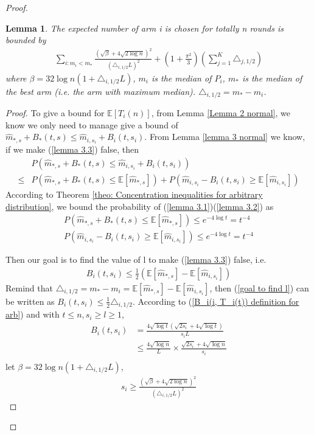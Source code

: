 \documentclass{article}
\theoremstyle{plain}
\newtheorem{lemma}{Lemma}
\begin{document}
\begin{proof}
\begin{lemma}
\label{Lemma 4: bound for E[T_i(n)]}
    The expected number of arm i is chosen for totally n rounds is bounded by
    \begin{align}
    \sum_{i: m_i < m_\ast} \frac{(\sqrt{\beta} + 4\sqrt{2\log n})^2}{ (\triangle_{i, 1/2} L)^2} + (1 + \frac{\pi^2}{3}) (\sum_{j=1}^K \triangle_{j, 1/2})
\end{align}
where $\beta = 32 \log n (1 + \triangle_{i, 1/2} L)$, $m_i$ is the median of $P_i$, $m_\ast$ is the median of the best arm (i.e. the arm with maximum median). $\triangle_{i, 1/2} = m_\ast - m_i$.
\end{lemma}

\begin{proof}
To give a bound for $\mathbb{E}[T_i(n)]$, from Lemma \ref{Lemma 2 normal}, we know we only need to manage give a bound of $\hat{m}_{*, s} + B_*(t, s)  \leq \hat{m}_{i, s_i} + B_i(t, s_i)$. From Lemma \ref{lemma 3 normal} we know, if we make (\ref{lemma 3.3}) false, then
\begin{align}
    & P(\hat{m}_{*, s} + B_*(t, s)  \leq \hat{m}_{i, s_i} + B_i(t, s_i)) \\
    \leq &  P(\hat{m}_{*, s} + B_*(t, s) \leq  \mathbb{E}[\hat{m}_{*, s}]) + P(\hat{m}_{i, s_i} - B_i(t, s_i) \geq \mathbb{E}[\hat{m}_{i, s_i}])
\end{align}
According to Theorem \ref{theo: Concentration inequalities for arbitrary distribution}, we bound the probability of (\ref{lemma 3.1})(\ref{lemma 3.2}) as
    \begin{align}
        P(\hat{m}_{*, s} + B_*(t, s) \leq  \mathbb{E}[\hat{m}_{*, s}]) \leq  e^{-4\log t} = t^{-4}\\
        P(\hat{m}_{i, s_i} - B_i(t, s_i) \geq \mathbb{E}[\hat{m}_{i, s_i}])  \leq  e^{-4\log t} = t^{-4}
    \end{align}

    Then our goal is to find the value of l to make (\ref{lemma 3.3}) false, i.e.
    \begin{align}
    \label{goal to find l}
        B_i(t, s_i) \leq  \frac{1}{2}(\mathbb{E}[\hat{m}_{*, s}] - \mathbb{E}[\hat{m}_{i, s_i}])
    \end{align}
    Remind that $\triangle_{i, 1/2} = m_* - m_i = \mathbb{E}[\hat{m}_{*, s}] - \mathbb{E}[\hat{m}_{i, s_i}]$, then (\ref{goal to find l}) can be written as $B_i(t, s_i) \leq  \frac{1}{2} \triangle_{i, 1/2}$. According to (\ref{B_i(i, T_i(t)) definition for arb}) and with $t \leq n, s_i \geq l \geq 1$,
    \begin{align}
        B_i(t, s_i) &= \frac{4 \sqrt{\log t} ( \sqrt{ 2s_i} + 4\sqrt{\log t})}{s_i L}\\
        & \leq \frac{4 \sqrt{\log n}}{ L} \times \frac{\sqrt{2s_i} + 4\sqrt{\log n}}{s_i}\\
    \end{align}
    let $\beta = 32 \log n (1 + \triangle_{i, 1/2} L)$,
    \begin{align}
        s_i \geq \frac{(\sqrt{\beta} + 4\sqrt{2\log n})^2}{ (\triangle_{i, 1/2} L)^2}
    \end{align}


\end{proof}
\end{proof}
\end{document}
